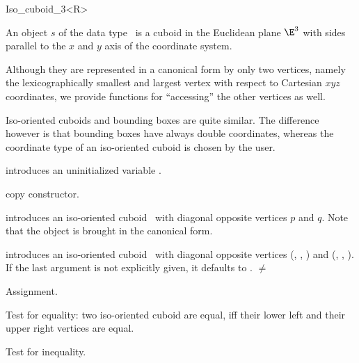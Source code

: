\begin{ccRefClass} {Iso_cuboid_3<R>}

\ccDefinition  An object $s$ of the data type \ccRefName\ is a
cuboid in the Euclidean plane $\E^3$ with sides parallel to the $x$ and
$y$ axis of the coordinate system.
 
Although they are represented in a canonical form by only two
vertices, namely the lexicographically smallest and largest vertex
with respect to Cartesian $xyz$ coordinates, we provide
functions for ``accessing'' the other vertices as well.

Iso-oriented cuboids and bounding boxes are quite similar. The
difference however is that bounding boxes have always double coordinates, 
whereas the coordinate type of an iso-oriented cuboid is chosen by
the user.


\ccCreation
{}


\ccHidden {}
             {introduces an uninitialized variable \ccVar.}

\ccHidden {}
 	    {copy constructor.}

            {introduces an iso-oriented cuboid \ccVar\ with diagonal
             opposite vertices $p$ and $q$. Note that the object is 
             brought in the canonical form.}

            {introduces an iso-oriented cuboid \ccVar\ with diagonal
             opposite vertices 
             (, , ) and
             (, , ).  
             If the last argument 
             is not explicitly given, it defaults to .
             \ccPrecond {} $\neq$  }


\ccOperations
\ccHidden {}
        {Assignment.}

       {Test for equality: two iso-oriented cuboid are equal, iff their
        lower left and their upper right vertices are equal.}

       {Test for inequality.}


\end{ccRefClass}
